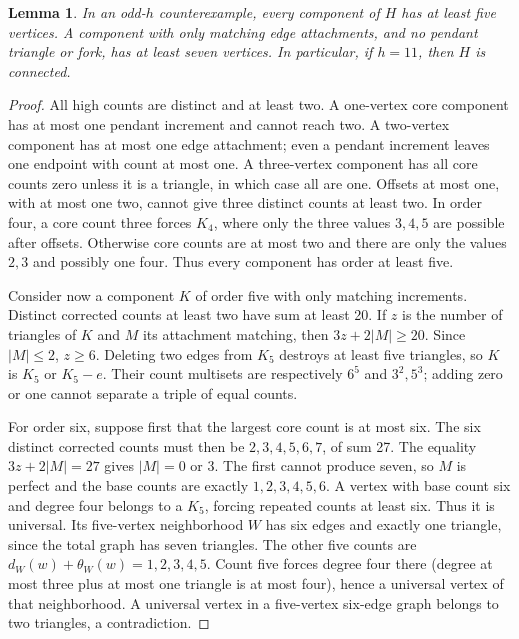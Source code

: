 \documentclass[11pt,a4paper]{article}
\newtheorem{lemma}[theorem]{Lemma}
\theoremstyle{definition}\newtheorem{definition}[theorem]{Definition}
\theoremstyle{remark}\newtheorem{remark}[theorem]{Remark}
\begin{document}
\begin{lemma}\label{paired:small-components}
In an odd-$h$ counterexample, every component of $H$ has at least five
vertices. A component with only matching edge attachments, and no
pendant triangle or fork, has at least seven vertices. In particular,
if $h=11$, then $H$ is connected.
\end{lemma}
\begin{proof}
All high counts are distinct and at least two. A one-vertex core
component has at most one pendant increment and cannot reach two.
A two-vertex component has at most one edge attachment; even a
pendant increment leaves one endpoint with count at most one. A
three-vertex component has all core counts zero unless it is a
triangle, in which case all are one. Offsets at most one, with at
most one two, cannot give three distinct counts at least two. In
order four, a core count three forces $K_4$, where only the three
values $3,4,5$ are possible after offsets. Otherwise core counts are
at most two and there are only the values $2,3$ and possibly one
four. Thus every component has order at least five.

Consider now a component $K$ of order five with only matching
increments. Distinct corrected counts at least two have sum at least
20. If $z$ is the number of triangles of $K$ and $M$ its attachment
matching, then $3z+2|M|\ge20$. Since $|M|\le2$, $z\ge6$.
Deleting two edges from $K_5$ destroys at least five triangles, so
$K$ is $K_5$ or $K_5-e$. Their count multisets are respectively
$6^5$ and $3^2,5^3$; adding zero or one cannot separate a triple
of equal counts.

For order six, suppose first that the largest core count is at most
six. The six distinct corrected counts must then be $2,3,4,5,6,7$,
of sum 27. The equality $3z+2|M|=27$ gives $|M|=0$ or $3$. The
first cannot produce seven, so $M$ is perfect and the base counts
are exactly $1,2,3,4,5,6$. A vertex with base count six and degree
four belongs to a $K_5$, forcing repeated counts at least six. Thus
it is universal. Its five-vertex neighborhood $W$ has six edges and
exactly one triangle, since the total graph has seven triangles.
The other five counts are $d_W(w)+\theta_W(w)=1,2,3,4,5$.
Count five forces degree four there (degree
at most three plus at most one triangle is at most four), hence a
universal vertex of that neighborhood. A universal vertex in a
five-vertex six-edge graph belongs to two triangles, a contradiction.


\end{proof}
\end{document}
